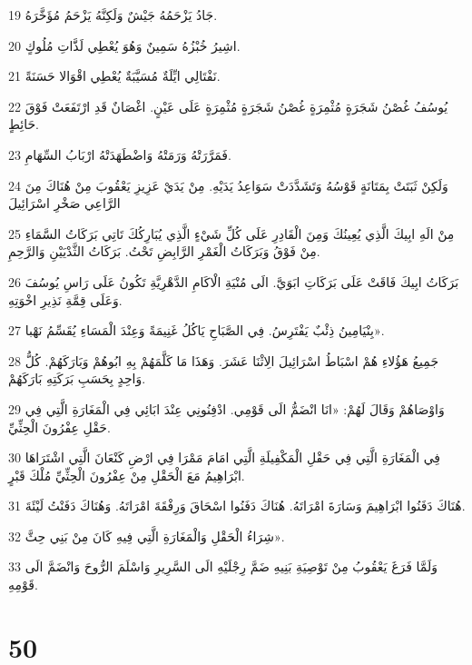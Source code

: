 \par 19 جَادُ يَزْحَمُهُ جَيْشٌ وَلَكِنَّهُ يَزْحَمُ مُؤَخَّرَهُ.
\par 20 اشِيرُ خُبْزُهُ سَمِينٌ وَهُوَ يُعْطِي لَذَّاتِ مُلُوكٍ.
\par 21 نَفْتَالِي ايِّلَةٌ مُسَيَّبَةٌ يُعْطِي اقْوَالا حَسَنَةً.
\par 22 يُوسُفُ غُصْنُ شَجَرَةٍ مُثْمِرَةٍ غُصْنُ شَجَرَةٍ مُثْمِرَةٍ عَلَى عَيْنٍ. اغْصَانٌ قَدِ ارْتَفَعَتْ فَوْقَ حَائِطٍ.
\par 23 فَمَرَّرَتْهُ وَرَمَتْهُ وَاضْطَهَدَتْهُ ارْبَابُ السِّهَامِ.
\par 24 وَلَكِنْ ثَبَتَتْ بِمَتَانَةٍ قَوْسُهُ وَتَشَدَّدَتْ سَوَاعِدُ يَدَيْهِ. مِنْ يَدَيْ عَزِيزِ يَعْقُوبَ مِنْ هُنَاكَ مِنَ الرَّاعِي صَخْرِ اسْرَائِيلَ
\par 25 مِنْ الَهِ ابِيكَ الَّذِي يُعِينُكَ وَمِنَ الْقَادِرِ عَلَى كُلِّ شَيْءٍ الَّذِي يُبَارِكُكَ تَاتِي بَرَكَاتُ السَّمَاءِ مِنْ فَوْقُ وَبَرَكَاتُ الْغَمْرِ الرَّابِضِ تَحْتُ. بَرَكَاتُ الثَّدْيَيْنِ وَالرَّحِمِ.
\par 26 بَرَكَاتُ ابِيكَ فَاقَتْ عَلَى بَرَكَاتِ ابَوَيَّ. الَى مُنْيَةِ الْاكَامِ الدَّهْرِيَّةِ تَكُونُ عَلَى رَاسِ يُوسُفَ وَعَلَى قِمَّةِ نَذِيرِ اخْوَتِهِ.
\par 27 بِنْيَامِينُ ذِئْبٌ يَفْتَرِسُ. فِي الصَّبَاحِ يَاكُلُ غَنِيمَةً وَعِنْدَ الْمَسَاءِ يُقَسِّمُ نَهْبا».
\par 28 جَمِيعُ هَؤُلاءِ هُمْ اسْبَاطُ اسْرَائِيلَ الِاثْنَا عَشَرَ. وَهَذَا مَا كَلَّمَهُمْ بِهِ ابُوهُمْ وَبَارَكَهُمْ. كُلُّ وَاحِدٍ بِحَسَبِ بَرَكَتِهِ بَارَكَهُمْ.
\par 29 وَاوْصَاهُمْ وَقَالَ لَهُمْ: «انَا انْضَمُّ الَى قَوْمِي. ادْفِنُونِي عِنْدَ ابَائِي فِي الْمَغَارَةِ الَّتِي فِي حَقْلِ عِفْرُونَ الْحِثِّيِّ.
\par 30 فِي الْمَغَارَةِ الَّتِي فِي حَقْلِ الْمَكْفِيلَةِ الَّتِي امَامَ مَمْرَا فِي ارْضِ كَنْعَانَ الَّتِي اشْتَرَاهَا ابْرَاهِيمُ مَعَ الْحَقْلِ مِنْ عِفْرُونَ الْحِثِّيِّ مُلْكَ قَبْرٍ.
\par 31 هُنَاكَ دَفَنُوا ابْرَاهِيمَ وَسَارَةَ امْرَاتَهُ. هُنَاكَ دَفَنُوا اسْحَاقَ وَرِفْقَةَ امْرَاتَهُ. وَهُنَاكَ دَفَنْتُ لَيْئَةَ.
\par 32 شِرَاءُ الْحَقْلِ وَالْمَغَارَةِ الَّتِي فِيهِ كَانَ مِنْ بَنِي حِثَّ».
\par 33 وَلَمَّا فَرَغَ يَعْقُوبُ مِنْ تَوْصِيَةِ بَنِيهِ ضَمَّ رِجْلَيْهِ الَى السَّرِيرِ وَاسْلَمَ الرُّوحَ وَانْضَمَّ الَى قَوْمِهِ.

\chapter{50}

